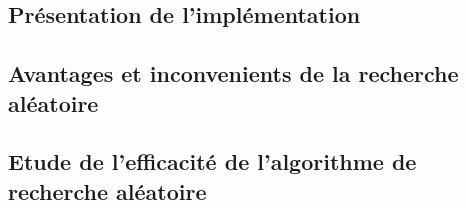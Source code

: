 \subsection[Présentation]{Présentation de l'implémentation}


\subsection[Différence]{Avantages et inconvenients de la recherche 
  aléatoire}


\subsection[Efficacité]{Etude de l'efficacité de l'algorithme de recherche
  aléatoire}


